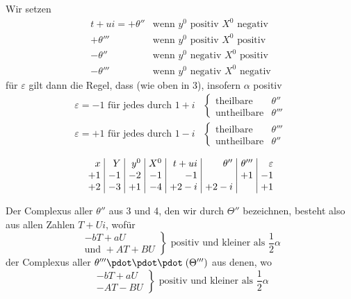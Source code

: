 Wir setzen
\[
\begin{array}{rl}
t+ui=+\theta''&\text{wenn }y^0\text{ positiv }X^0\text{ negativ}\\
+\theta'''&\text{wenn }y^0\text{ positiv }X^0\text{ positiv}\\
-\theta''&\text{wenn }y^0\text{ negativ }X^0\text{ positiv}\\
-\theta'''&\text{wenn }y^0\text{ negativ }X^0\text{ negativ}
\end{array}
\]
für $\varepsilon$ gilt dann die Regel, dass (wie oben in 3), insofern $\alpha$ positiv
\[
\begin{aligned}
\varepsilon=-1\text{ für jedes durch }1+i&\left\{\begin{array}{ll}\text{theilbare}&\theta''\\\text{untheilbare}&\theta'''\end{array}\right.\\[3pt]
\varepsilon=+1\text{ für jedes durch }1-i&\left\{\begin{array}{ll}\text{theilbare}&\theta'''\\\text{untheilbare}&\theta''\end{array}\right.
\end{aligned}
\]

\[
\setlength{\arraycolsep}{4pt}
\begin{array}{r|r|r|r|r|r|r|r}
x&Y&y^0&X^0&t+ui&\theta''&\theta'''&\varepsilon\\
+1&-1&-2&-1&-1&&+1&-1\\
+2&-3&+1&-4&+2-i&+2-i&&+1
\end{array}
\]

Der Complexus aller $\theta''$ aus 3 und 4, den wir durch $\Theta''$ bezeichnen, besteht also aus allen Zahlen $T+Ui$, wofür
\[
\left.\begin{array}{r}
-bT+aU\\
\text{und }+AT+BU
\end{array}\right\}\text{ positiv und kleiner als }\frac12\alpha
\]
der Complexus aller $\theta'''\pdot\pdot\pdot\;(\Theta''')$ aus denen, wo
\[
\left.\begin{array}{r}
-bT+aU\\
-AT-BU
\end{array}\right\}\text{ positiv und kleiner als }\frac12\alpha
\]

